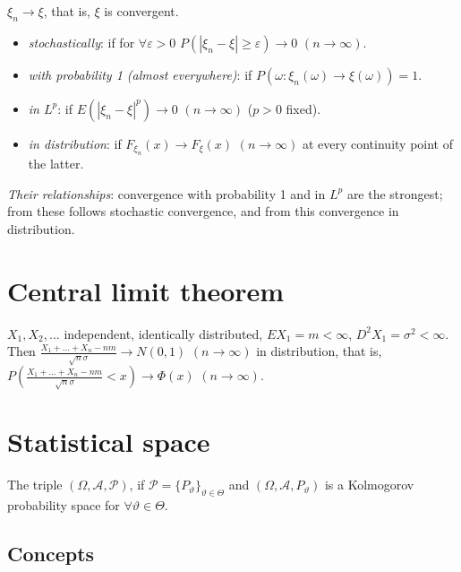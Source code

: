 \documentclass[margin=0px]{article}
\begin{document}
$\xi_n \to \xi$, that is, $\xi$ is convergent.
\begin{itemize}
    \item \textit{stochastically}: if for $\forall \varepsilon > 0$ $P(|\xi_n - \xi| \geq \varepsilon) \rightarrow 0$ $(n \to \infty)$.
    \item \textit{with probability 1 (almost everywhere)}: if $P(\omega : \xi_n(\omega) \to \xi(\omega)) = 1$.
    \item \textit{in $L^p$}: if $E(|\xi_n - \xi|^p) \rightarrow 0$ $(n \to \infty)$ ($p>0$ fixed).
    \item \textit{in distribution}: if $F_{\xi_n}(x) \rightarrow F_{\xi}(x)$ $(n \to \infty)$ at every continuity point of the latter.
\end{itemize}
\textit{Their relationships}: convergence with probability 1 and in $L^p$ are the strongest; from these follows stochastic convergence, and from this convergence in distribution.

\section{Central limit theorem}

$X_1, X_2, ...$ independent, identically distributed, $EX_1 = m < \infty$, $D^{2}X_1 = \sigma^2 < \infty$. \\
Then $\frac{X_1 + ... + X_n - nm}{\sqrt{n}\sigma} \rightarrow N(0,1)$ $(n \to \infty)$ in distribution, that is, $P(\frac{X_1 + ... + X_n - nm}{\sqrt{n}\sigma} < x) \rightarrow \Phi(x)$ $(n \to \infty)$.

\section{Statistical space}

The triple $(\Omega, \mathcal{A}, \mathcal{P})$, if $\mathcal{P} = \{P_{\vartheta}\}_{\vartheta \in \Theta}$ and $(\Omega, \mathcal{A}, P_{\vartheta})$ is a Kolmogorov probability space for $\forall \vartheta \in \Theta$.

\subsection{Concepts}
\end{document}
